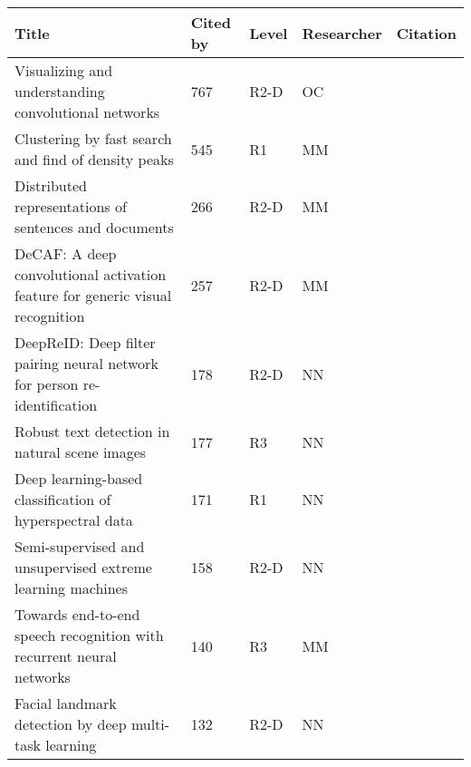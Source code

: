 \begin{tabularx}{\textwidth}{Xllll}
\toprule
                                                                         Title &  Cited by & Level & Researcher &                          Citation \\
\midrule
 Visualizing and understanding convolutional networks &  767 &  R2-D &  OC &  {\cite{zeiler2014visualizing}} \\
 Clustering by fast search and find of density peaks &  545 &  R1 &  MM &  {\cite{rodriguez2014clustering}} \\
 Distributed representations of sentences and documents &  266 &  R2-D &  MM &  {\cite{le2014distributed}} \\
 DeCAF: A deep convolutional activation feature for generic visual recognition &  257 &  R2-D &  MM &  {\cite{donahue2014decaf}} \\
 DeepReID: Deep filter pairing neural network for person re-identification &  178 &  R2-D &  NN &  {\cite{li2014deepreid}} \\
 Robust text detection in natural scene images &  177 &  R3 &  NN &  {\cite{yin2014robust}} \\
 Deep learning-based classification of hyperspectral data &  171 &  R1 &  NN &  {\cite{chen2014deep}} \\
 Semi-supervised and unsupervised extreme learning machines &  158 &  R2-D &  NN &  {\cite{huang2014semi}} \\
 Towards end-to-end speech recognition with recurrent neural networks &  140 &  R3 &  MM &  {\cite{graves2014towards}} \\
 Facial landmark detection by deep multi-task learning &  132 &  R2-D &  NN &  {\cite{zhang2014facial}} \\
\bottomrule
\end{tabularx}
